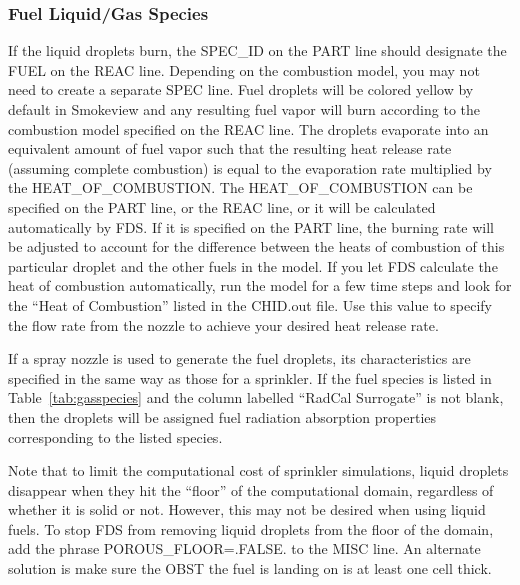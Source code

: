 \documentclass[11pt]{book}
\begin{document}
\subsubsection{Fuel Liquid/Gas Species}
\label{info:fuel_droplets}
\label{spray_burner}

If the liquid droplets burn, the {\ct SPEC\_ID} on the {\ct PART} line should designate the {\ct FUEL} on the {\ct REAC} line. Depending on the combustion model, you may not need to create a separate {\ct SPEC} line. Fuel droplets will be colored yellow by default in Smokeview and any resulting fuel vapor will burn according to the combustion model specified on the {\ct REAC} line. The droplets evaporate into an equivalent amount of fuel vapor such that the resulting heat release rate (assuming complete combustion) is equal to the evaporation rate multiplied by the {\ct HEAT\_OF\_COMBUSTION}. The {\ct HEAT\_OF\_COMBUSTION} can be specified on the {\ct PART} line, or the {\ct REAC} line, or it will be calculated automatically by FDS. If it is specified on the {\ct PART} line, the burning rate will be adjusted to account for the difference between the heats of combustion of this particular droplet and the other fuels in the model. If you let FDS calculate the heat of combustion automatically, run the model for a few time steps and look for the ``Heat of Combustion'' listed in the {\ct CHID.out} file. Use this value to specify the flow rate from the nozzle to achieve your desired heat release rate.

If a spray nozzle is used to generate the fuel droplets, its characteristics are specified in the same way as those for a sprinkler.  If the fuel species is listed in Table~\ref{tab:gasspecies} and the column labelled ``RadCal Surrogate'' is not blank, then the droplets will be assigned fuel radiation absorption properties corresponding to the listed species.

Note that to limit the computational cost of sprinkler simulations, liquid droplets disappear when they hit the ``floor'' of the computational domain, regardless of whether it is solid or not. However, this may not be desired when using liquid fuels. To stop FDS from removing liquid droplets from the floor of the domain, add the phrase {\ct POROUS\_FLOOR=.FALSE.} to the {\ct MISC} line. An alternate solution is make sure the {\ct OBST} the fuel is landing on is at least one cell thick.
\end{document}
